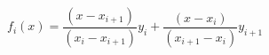 \documentclass[12pt]{article}
\begin{document}
$ \begin{equation*}f_i(x)=\dfrac{(x-x_{i+1})}{(x_i-x_{i+1})}y_i + \dfrac{(x-x_i)}{(x_{i+1}-x_i)}y_{i+1}\end{equation*} $
\end{document}
